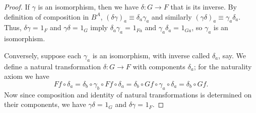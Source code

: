 \documentclass[10pt,a4paper]{article}
\newcommand{\jdeq}{\equiv}      %
\newcommand{\id}[3][]{\ensuremath{#2 =_{#1} #3}\xspace}
\theoremstyle{definition}
\theoremstyle{remark}
\numberwithin{equation}{section}
\begin{document}
\begin{proof}
  If $\gamma$ is an isomorphism, then we have $\delta:G\to F$ that is its inverse.
  By definition of composition in $B^A$, $(\delta\gamma)_a\jdeq \delta_a\gamma_a$ and similarly $(\gamma\delta)_a\jdeq \gamma_a\delta_a$.
  Thus, $\id{\delta\gamma}{1_F}$ and $\id{\gamma\delta}{1_G}$ imply $\id{\delta_a\gamma_a}{1_{Fa}}$ and $\id{\gamma_a\delta_a}{1_{Ga}}$, so $\gamma_a$ is an isomorphism.

  Conversely, suppose each $\gamma_a$ is an isomorphism, with inverse called $\delta_a$, say.
We define a natural transformation $\delta:G\to F$ with components $\delta_a$; for the naturality axiom we have
  \[ Ff\circ \delta_a = \delta_b\circ \gamma_b\circ Ff \circ \delta_a = \delta_b\circ Gf\circ \gamma_a\circ \delta_a = \delta_b\circ Gf. \]
  Now since composition and identity of natural transformations is determined on their components, we have $\id{\gamma\delta}{1_G}$ and $\id{\delta\gamma}{1_F}$.
\end{proof}
\end{document}
